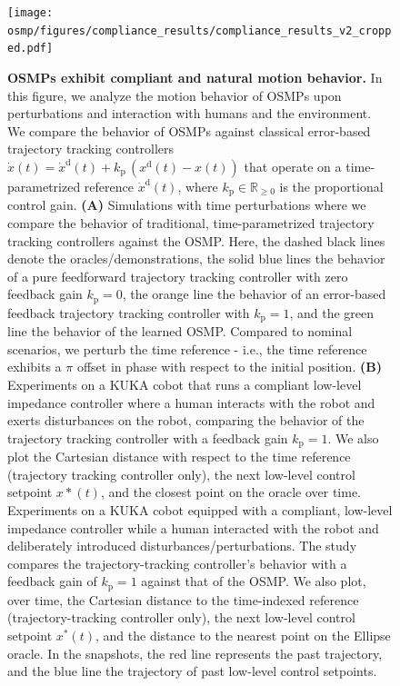 \begin{figure}[h!]
    \centering
    \texttt{[image: osmp/figures/compliance\_results/compliance\_results\_v2\_cropped.pdf]}
    \caption{{\textbf{\glspl{OSMP} exhibit compliant and natural motion behavior.}
    In this figure, we analyze the motion behavior of \glspl{OSMP} upon perturbations and interaction with humans and the environment. We compare the behavior of \glspl{OSMP} against classical error-based trajectory tracking controllers $\dot{x}(t) = \dot{x}^\mathrm{d}(t) + k_\mathrm{p} \, (x^\mathrm{d}(t) - x(t))$ that operate on a time-parametrized reference $\dot{x}^\mathrm{d}(t)$, where $k_\mathrm{p} \in \mathbb{R}_{\geq 0}$ is the proportional control gain.
    \textbf{(A)} Simulations with time perturbations where we compare the behavior of traditional, time-parametrized trajectory tracking controllers against the \gls{OSMP}. Here, the dashed black lines denote the oracles/demonstrations, the solid blue lines the behavior of a pure feedforward trajectory tracking controller with zero feedback gain $k_\mathrm{p} = 0$, the orange line the behavior of an error-based feedback trajectory tracking controller with $k_\mathrm{p} = 1$, and the green line the behavior of the learned \gls{OSMP}. Compared to nominal scenarios, we perturb the time reference - i.e., the time reference exhibits a $\pi$ offset in phase with respect to the initial position.
    \textbf{(B)} Experiments on a KUKA cobot that runs a compliant low-level impedance controller where a human interacts with the robot and exerts disturbances on the robot, comparing the behavior of the trajectory tracking controller with a feedback gain $k_\mathrm{p} = 1$. We also plot the Cartesian distance with respect to the time reference (trajectory tracking controller only), the next low-level control setpoint $x*(t)$, and the closest point on the oracle over time.
    Experiments on a KUKA cobot equipped with a compliant, low-level impedance controller while a human interacted with the robot and deliberately introduced disturbances/perturbations. The study compares the trajectory-tracking controller’s behavior with a feedback gain of $k_\mathrm{p}=1$ against that of the \gls{OSMP}. We also plot, over time, the Cartesian distance to the time-indexed reference (trajectory-tracking controller only), the next low-level control setpoint $x^*(t)$, and the distance to the nearest point on the Ellipse oracle.
    In the snapshots, the red line represents the past trajectory, and the blue line the trajectory of past low-level control setpoints.
    }}
    \label{fig:osmp:compliance_results}
\end{figure}

